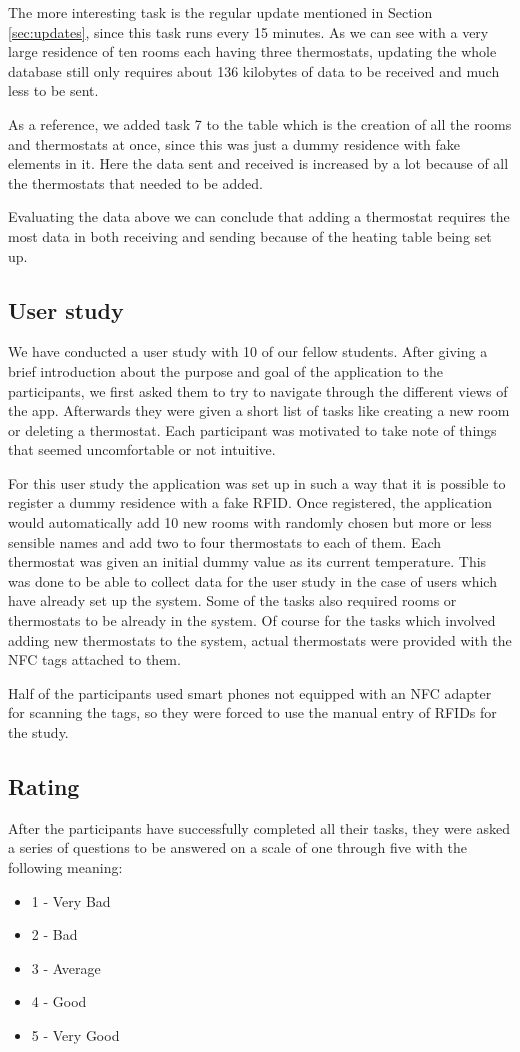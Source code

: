 The more interesting task is the regular update mentioned in Section \ref{sec:updates}, since this task runs every 15 minutes. As we can see with a very large residence of ten rooms each having three thermostats, updating the whole database still only requires about 136 kilobytes of data to be received and much less to be sent.

As a reference, we added task 7 to the table which is the creation of all the rooms and thermostats at once, since this was just a dummy residence with fake elements in it. Here the data sent and received is increased by a lot because of all the thermostats that needed to be added.

Evaluating the data above we can conclude that adding a thermostat requires the most data in both receiving and sending because of the heating table being set up.

\subsection{User study}
We have conducted a user study with 10 of our fellow students. After giving a brief introduction about the purpose and goal of the application to the participants, we first asked them to try to navigate through the different views of the app. Afterwards they were given a short list of tasks like creating a new room or deleting a thermostat. Each participant was motivated to take note of things that seemed uncomfortable or not intuitive.

For this user study the application was set up in such a way that it is possible to register a dummy residence with a fake RFID. Once registered, the application would automatically add 10 new rooms with randomly chosen but more or less sensible names and add two to four thermostats to each of them. Each thermostat was given an initial dummy value as its current temperature. This was done to be able to collect data for the user study in the case of users which have already set up the system. Some of the tasks also required rooms or thermostats to be already in the system. Of course for the tasks which involved adding new thermostats to the system, actual thermostats were provided with the NFC tags attached to them.

Half of the participants used smart phones not equipped with an NFC adapter for scanning the tags, so they were forced to use the manual entry of RFIDs for the study.

\subsection{Rating}
\label{sec:rating}
After the participants have successfully completed all their tasks, they were asked a series of questions to be answered on a scale of one through five with the following meaning:
\begin{itemize}
\item{1 - Very Bad}
\item{2 - Bad}
\item{3 - Average}
\item{4 - Good}
\item{5 - Very Good}
\end{itemize}

